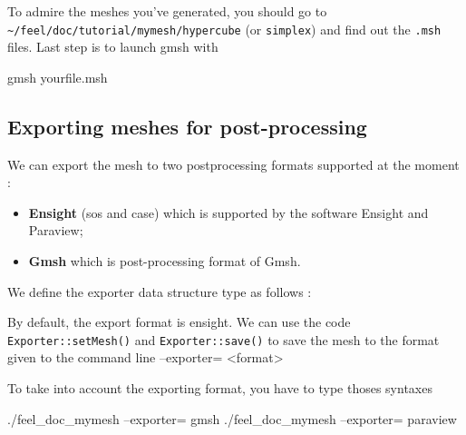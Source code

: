To admire the meshes you've generated, you should go to \lstinline!~/feel/doc/tutorial/mymesh/hypercube! (or \lstinline!simplex!) and find out the \verb|.msh| files. Last step is to launch gmsh with
\begin{unixcom}
		gmsh yourfile.msh
\end{unixcom}

\subsection{Exporting meshes for post-processing}

We can export the mesh to two postprocessing formats supported at the moment :
\begin{itemize}
\item \textbf{Ensight} (sos and case)  which is supported by the software Ensight and Paraview;
\item \textbf{Gmsh} which is post-processing format of Gmsh.
\end{itemize}

We define the exporter data structure type as follows :


By default, the  export format is ensight. We can use the code \lstinline!Exporter::setMesh()! and \lstinline!Exporter::save()! to save the mesh to the format given to the command line --exporter= <format>



To take into account the exporting format, you have to type thoses syntaxes
\begin{unixcom}
		./feel_doc_mymesh  --exporter= gmsh
		./feel_doc_mymesh  --exporter= paraview
\end{unixcom}


